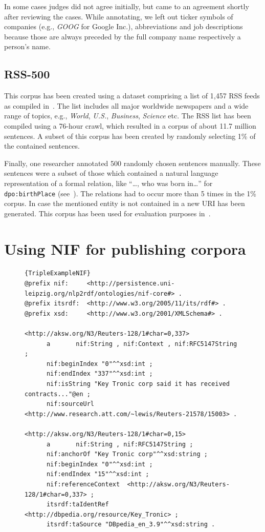 In some cases judges did not agree initially, but came to an agreement shortly after reviewing the cases.
While annotating, we left out ticker symbols of companies (e.g., \textit{GOOG} for Google Inc.), abbreviations and job descriptions because those are always preceded by the full company name respectively a person's name.


\subsection{RSS-500}

This corpus has been created using a dataset comprising a list of 1,457 RSS feeds as compiled in~\cite{GOLDHAHN12.327}.
The list includes all major worldwide newspapers and a wide range of topics, e.g., \emph{World}, \emph{U.S.}, \emph{Business}, \emph{Science} etc.
The RSS list has been compiled using a 76-hour crawl, which resulted in a corpus of about 11.7 million sentences.
A subset of this corpus has been created by randomly selecting 1\% of the contained sentences.
 
Finally, one researcher annotated 500 randomly chosen sentences manually.
These sentences were a subset of those which contained a natural language representation of a formal relation, like ``\ldots, who was born in\ldots '' for \texttt{dpo:birthPlace} (see~\cite{conf/ekaw/GerberN12}).
The relations had to occur more than 5 times in the 1\% corpus. %
In case the mentioned entity is not contained in a new URI has been generated.
This corpus has been used for evaluation purposes in~\cite{GER+13}.

\section{Using NIF for publishing corpora}
\label{n3:NIF}



\begin{figure}[t!]
\begin{lstlisting}[label=n3:TripleExampleNIF,caption=example of the resulting N3-triples.]{TripleExampleNIF}
@prefix nif:     <http://persistence.uni-leipzig.org/nlp2rdf/ontologies/nif-core#> .
@prefix itsrdf:  <http://www.w3.org/2005/11/its/rdf#> .
@prefix xsd:     <http://www.w3.org/2001/XMLSchema#> .

<http://aksw.org/N3/Reuters-128/1#char=0,337>
      a       nif:String , nif:Context , nif:RFC5147String ;
      nif:beginIndex "0"^^xsd:int ;
      nif:endIndex "337"^^xsd:int ;
      nif:isString "Key Tronic corp said it has received contracts..."@en ;
      nif:sourceUrl <http://www.research.att.com/~lewis/Reuters-21578/15003> .

<http://aksw.org/N3/Reuters-128/1#char=0,15>
      a       nif:String , nif:RFC5147String ;
      nif:anchorOf "Key Tronic corp"^^xsd:string ;
      nif:beginIndex "0"^^xsd:int ;
      nif:endIndex "15"^^xsd:int ;
      nif:referenceContext  <http://aksw.org/N3/Reuters-128/1#char=0,337> ;
      itsrdf:taIdentRef <http://dbpedia.org/resource/Key_Tronic> ;
      itsrdf:taSource "DBpedia_en_3.9"^^xsd:string .
\end{lstlisting}
\end{figure}




